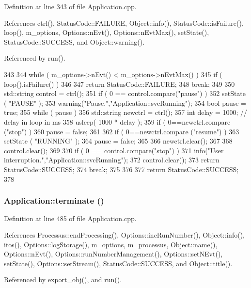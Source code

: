 Definition at line 343 of file Application.cpp.

References ctrl(), StatusCode::FAILURE, Object::info(), StatusCode::isFailure(), loop(), m\_\-options, Options::nEvt(), Options::nEvtMax(), setState(), StatusCode::SUCCESS, and Object::warning().

Referenced by run().


\begin{DoxyCode}
343                                      {
344   while ( m_options->nEvt() < m_options->nEvtMax() ) {
345     if ( loop().isFailure() )
346       {
347     return StatusCode::FAILURE;
348     break;
349       }
350     std::string control = ctrl();
351     if ( 0 == control.compare("pause") ) {
352       setState ( "PAUSE" );
353       warning("Pause.","Application::svcRunning");
354       bool pause = true;
355       while ( pause ) {
356     std::string newctrl = ctrl();
357     int delay = 1000; // delay in loop in ms
358     usleep( 1000 * delay );
359     if ( 0==newctrl.compare ("stop") ) {
360       pause = false;
361     }
362     if ( 0==newctrl.compare ("resume") ) {
363       setState ( "RUNNING" );
364       pause = false;
365     }
366     newctrl.clear();
367       }
368       control.clear();
369     }
370     if ( 0 == control.compare("stop") ) {
371       info("User interruption.","Application::svcRunning");
372       control.clear();
373       return StatusCode::SUCCESS;
374       break;
375     }
376   }
377   return StatusCode::SUCCESS;
378 }
\end{DoxyCode}
\hypertarget{classApplication_a1a36a06d48d94a9a8fdc29a77d2cb9f0}{
\subsubsection[{terminate}]{ Application::terminate ()}}
\label{classApplication_a1a36a06d48d94a9a8fdc29a77d2cb9f0}


Definition at line 485 of file Application.cpp.

References Processus::endProcessing(), Options::incRunNumber(), Object::info(), itos(), Options::logStorage(), m\_\-options, m\_\-processus, Object::name(), Options::nEvt(), Options::runNumberManagement(), Options::setNEvt(), setState(), Options::setStream(), StatusCode::SUCCESS, and Object::title().

Referenced by export\_\-obj(), and run().


